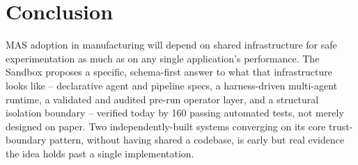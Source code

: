 \documentclass[10pt,conference]{IEEEtran}
\newcommand{\scaffold}[1]{\textit{#1}}
\begin{document}
\section{Conclusion}
\label{sec:conclusion}
MAS adoption in manufacturing will depend on shared infrastructure for safe
experimentation as much as on any single application's performance. The
Sandbox proposes a specific, schema-first answer to what that
infrastructure looks like -- declarative agent and pipeline specs, a
harness-driven multi-agent runtime, a validated and audited pre-run operator
layer, and a structural isolation boundary -- verified today by 160 passing
automated tests, not merely designed on paper. Two independently-built
systems converging on its core trust-boundary pattern, without having
shared a codebase, is early but real evidence the idea holds past a single
implementation.

\end{document}
